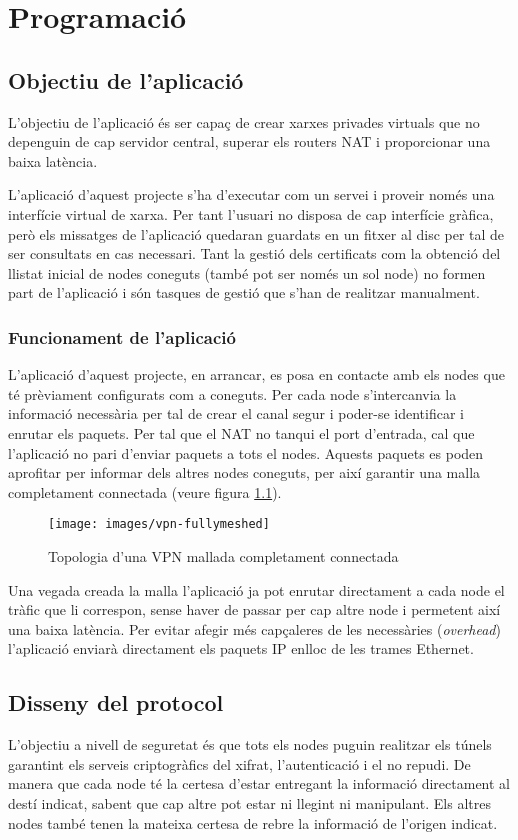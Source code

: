\chapter{Programació}
\section{Objectiu de l'aplicació}
L'objectiu de l'aplicació és ser capaç de crear xarxes privades virtuals que no depenguin de cap servidor central, superar els routers NAT i proporcionar una baixa latència.

L'aplicació d'aquest projecte s'ha d'executar com un servei i proveir només una interfície virtual de xarxa. Per tant l'usuari no disposa de cap interfície gràfica, però els missatges de l'aplicació quedaran guardats en un fitxer al disc per tal de ser consultats en cas necessari.
Tant la gestió dels certificats com la obtenció del llistat inicial de nodes coneguts (també pot ser només un sol node) no formen part de l'aplicació i són tasques de gestió que s'han de realitzar manualment.

\subsection{Funcionament de l'aplicació}
L'aplicació d'aquest projecte, en arrancar, es posa en contacte amb els nodes que té prèviament configurats com a coneguts. Per cada node s'intercanvia la informació necessària per tal de crear el canal segur i poder-se identificar i enrutar els paquets. Per tal que el NAT no tanqui el port d'entrada, cal que l'aplicació no pari d'enviar paquets a tots el nodes. Aquests paquets es poden aprofitar per informar dels altres nodes coneguts, per així garantir una malla completament connectada (veure figura \ref{F:vpn-fullymeshed}).
\begin{figure}[htb]
\centering
\texttt{[image: images/vpn-fullymeshed]}
\caption{Topologia d'una VPN mallada completament connectada}
\label{F:vpn-fullymeshed}
\end{figure}

Una vegada creada la malla l'aplicació ja pot enrutar directament a cada node el tràfic que li correspon, sense haver de passar per cap altre node i permetent així una baixa latència. Per evitar afegir més capçaleres de les necessàries (\emph{overhead}) l'aplicació enviarà directament els paquets IP enlloc de les trames Ethernet.

\section{Disseny del protocol}
L'objectiu a nivell de seguretat és que tots els nodes puguin realitzar els túnels garantint els serveis criptogràfics del xifrat, l'autenticació i el no repudi. De manera que cada node té la certesa d'estar entregant la informació directament al destí indicat, sabent que cap altre pot estar ni llegint ni manipulant. Els altres nodes també tenen la mateixa certesa de rebre la informació de l'origen indicat.

